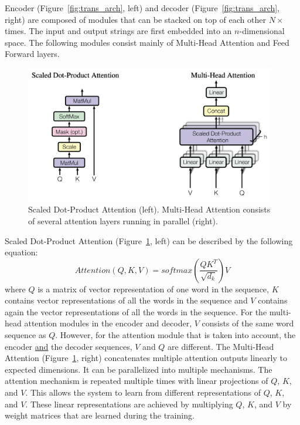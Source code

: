 Encoder (Figure~\ref{fig:trans_arch}, left) and decoder (Figure~\ref{fig:trans_arch}, right) are composed of modules that can be stacked on top of each other $N\times$ times. The input and output strings are first embedded into an $n$-dimensional space. The following modules consist mainly of Multi-Head Attention and Feed Forward layers. 

\begin{figure}[h] %
    \centering
    \includegraphics[height=60mm]{figures/03_blocks_overview.png} %
    \caption{Scaled Dot-Product Attention (left). Multi-Head Attention consists of several attention layers running in parallel (right). \cite{vaswani2017attention}} %
    \label{fig:trans_attn} %
\end{figure} 

Scaled Dot-Product Attention (Figure~\ref{fig:trans_attn}, left) can be described by the following equation:
\begin{equation} \label{eq:1}
Attention(Q,K,V) = softmax(\frac{QK^T}{\sqrt{d_k}})V
\end{equation}
where $Q$ is a matrix of vector representation of one word in the sequence, $K$ contains vector representations of all the words in the sequence and $V$ contains again the vector representations of all the words in the sequence. For the multi-head attention modules in the encoder and decoder, $V$ consists of the same word sequence as $Q$. However, for the attention module that is taken into account, the encoder \underline{and} the decoder sequences, $V$ and $Q$ are different. The Multi-Head Attention (Figure~\ref{fig:trans_attn}, right) concatenates multiple attention outputs linearly to expected dimensions. It can be parallelized into multiple mechanisms. The attention mechanism is repeated multiple times with linear projections of $Q$, $K$, and $V$. This allows the system to learn from different representations of $Q$, $K$, and $V$. These linear representations are achieved by multiplying $Q$, $K$, and $V$ by weight matrices that are learned during the training.

